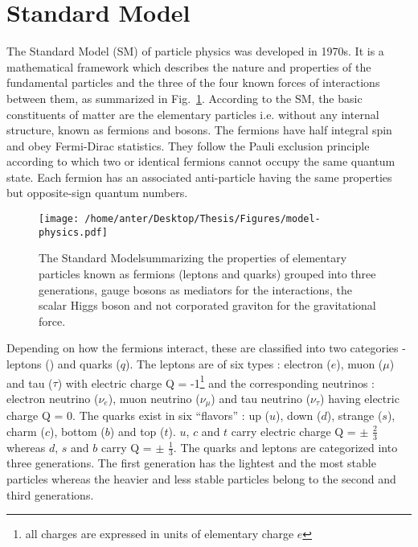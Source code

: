 \section{Standard Model}
The Standard Model (SM) of particle physics \cite{Perkins:1982xb,Herrero:1998eq,Weinberg:1967tq} was developed in 1970s. It is a mathematical framework which describes the nature and properties of the fundamental particles and the three of the four known forces of interactions between them, as summarized in Fig.~\ref{fig:SM}. According to the SM, the basic constituents of matter are the elementary particles i.e. without any internal structure, known as fermions and bosons. The fermions have half integral spin and obey Fermi-Dirac statistics. They follow the Pauli exclusion principle according to which two or identical fermions cannot occupy the same quantum state. Each fermion has an associated anti-particle having the same properties but opposite-sign quantum numbers.
\begin{figure}[!h]
\begin{center}
\hspace*{-15mm}
\texttt{[image: /home/anter/Desktop/Thesis/Figures/model-physics.pdf]}\\
\caption[The Standard Model summarizing the properties of elementary particles and their forces of interaction.]{The Standard Model\footnotemark summarizing the properties of elementary particles known as fermions (leptons and quarks) grouped into three generations, gauge bosons as mediators for the interactions, the scalar Higgs boson and not corporated graviton for the gravitational force.}
\label{fig:SM}
\end{center}
\end{figure}
Depending on how the fermions interact, these are classified into two categories - leptons (\sln) and quarks ($q$). The leptons are of six types : electron ($e$), muon ($\mu$) and tau ($\tau$) with electric charge Q = -1\footnote{all charges are expressed in units of elementary charge $e$} and the corresponding neutrinos : electron neutrino ($\nu_e$), muon neutrino ($\nu_\mu$) and tau neutrino ($\nu_\tau$) having electric charge Q = 0. The quarks exist in six ``flavors'' : up ($u$), down ($d$), strange ($s$), charm ($c$), bottom ($b$) and top ($t$). $u$, $c$ and $t$ carry electric charge Q = $\pm$ $\frac{2}{3}$ whereas $d$, $s$ and $b$ carry Q = $\pm$ $\frac{1}{3}$. The quarks and leptons are categorized into three generations. The first generation has the lightest and the most stable particles whereas the heavier and less stable particles belong to the second and third generations.

